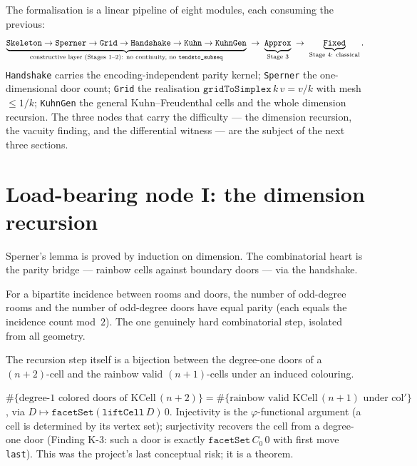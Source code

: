 The formalisation is a linear pipeline of eight modules, each consuming the previous:
\[
  \underbrace{\texttt{Skeleton} \to \texttt{Sperner} \to \texttt{Grid} \to
  \texttt{Handshake} \to \texttt{Kuhn} \to \texttt{KuhnGen}}_{\text{constructive layer
  (Stages 1--2): no continuity, no \texttt{tendsto\_subseq}}}
  \;\to\;
  \underbrace{\texttt{Approx}}_{\text{Stage 3}}
  \;\to\;
  \underbrace{\texttt{Fixed}}_{\text{Stage 4: classical}}.
\]
\texttt{Handshake} carries the encoding-independent parity kernel; \texttt{Sperner}
the one-dimensional door count; \texttt{Grid} the realisation
$\texttt{gridToSimplex}\,k\,v = v/k$ with mesh $\le 1/k$; \texttt{KuhnGen} the
general Kuhn--Freudenthal cells and the whole dimension recursion.  The three nodes
that carry the difficulty --- the dimension recursion, the vacuity finding, and the
differential witness --- are the subject of the next three sections.

\section{Load-bearing node I: the dimension recursion}
\label{sec:brouwer_recursion}

Sperner's lemma is proved by induction on dimension.  The combinatorial heart is the
parity bridge --- rainbow cells against boundary doors --- via the handshake.

\begin{theorem}
\label{thm:brouwer_handshake}
\leanok
For a bipartite incidence between rooms and doors, the number of odd-degree rooms and
the number of odd-degree doors have equal parity (each equals the incidence count
mod~$2$).  The one genuinely hard combinatorial step, isolated from all geometry.
\end{theorem}

The recursion step itself is a bijection between the degree-one doors of a
$(n{+}2)$-cell and the rainbow valid $(n{+}1)$-cells under an induced colouring.

\begin{theorem}
\label{thm:brouwer_drop}
\leanok
{}
$\#\{\text{degree-1 colored doors of } \mathrm{KCell}\,(n{+}2)\}
  = \#\{\text{rainbow valid } \mathrm{KCell}\,(n{+}1) \text{ under } \mathrm{col}'\}$,
via $D \mapsto \texttt{facetSet}(\texttt{liftCell}\,D)\,0$.  Injectivity is the
$\varphi$-functional argument (a cell is determined by its vertex set); surjectivity
recovers the cell from a degree-one door (Finding K-3: such a door is exactly
$\texttt{facetSet}\,C_0\,0$ with first move \texttt{last}).  This was the project's
last conceptual risk; it is a theorem.
\end{theorem}


